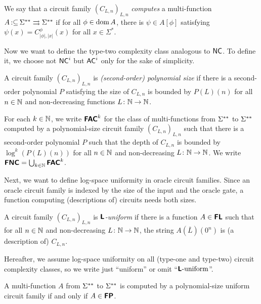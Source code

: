 \documentclass[envcountsect,envcountsame,orivec,oribibl]{llncs}
\newcommand{\pcolon}{\mathpunct{\,:\subseteq}}
\begin{document}
\begin{definition}
 We say that a circuit family $(C_{L,n})_{L,n}$ 
\emph{computes} a multi-function 
 $A \pcolon \LM \rightrightarrows \LM$ if for all $\phi \in \mathop{\rm dom} A$, 
 there is $\psi \in A[\phi]$ satisfying $\psi(x) = C_{|\phi|, |x|}^\phi(x)$
 for all $x \in \Sigma^*$.
\end{definition}

Now we want to define the type-two complexity class analogous to $\mathsf{NC}$.
To define it, we choose not $\mathsf{NC}^i$ but $\mathsf{AC}^i$ 
only for the sake of simplicity.

A circuit family $(C_{L,n})_{L,n}$ is \emph{(second-order) polynomial size}
if there is a second-order polynomial $P$ satisfying
the size of $C_{L,n}$ is bounded by $P(L)(n)$ 
for all $n \in \mathbb N$ and non-decreasing functions
$L \colon \mathbb N \to \mathbb N$.

\begin{definition}
 For each $k \in \mathbb N$, 
 we write $\text{\bfseries \sffamily \upshape FAC}^k$ for the class of 
 multi-functions from $\Sigma ^{**}$ to $\Sigma ^{**}$ computed by
 a polynomial-size circuit family $(C_{L,n})_{L,n}$ such that
 there is a second-order polynomial $P$ such that 
 the depth of $C_{L,n}$ is bounded by $\log^k(P(L)(n))$ 
 for all $n \in \mathbb N$ and non-decreasing
 $L \colon \mathbb N \to \mathbb N$.
 We write $\text{\bfseries \sffamily \upshape FNC} = \bigcup_{k \in \mathbb N} \text{\bfseries \sffamily \upshape FAC}^k$.
\end{definition}

Next, we want to define log-space uniformity in oracle circuit families.
Since an oracle circuit family is indexed by the size of the input and the oracle gate,
a function computing (descriptions of) circuits needs both sizes.

\begin{definition}[uniformity]
A circuit family $(C_{L,n})_{L,n}$ is \emph{$\text{\bfseries \sffamily \upshape L}$-uniform} if there is a function $A \in \text{\bfseries \sffamily \upshape FL}$ 
such that for all $n \in \mathbb N$ and non-decreasing $L \colon \mathbb N \to \mathbb N$, 
the string $A (\overline L) (0^n)$ is (a description of) $C_{L,n}$. 
\end{definition}

Hereafter, we assume log-space uniformity on all (type-one and type-two) 
circuit complexity classes, so we write just ``uniform'' or omit ``$\text{\bfseries \sffamily \upshape L}\text{-uniform}$''.

\begin{theorem}
\label{theorem:P-equals-L-uniform-P-poly}
A multi-function $A$ from $\Sigma ^{**}$ to $\Sigma ^{**}$ is computed by a polynomial-size
uniform circuit family if and only if $A \in \text{\bfseries \sffamily \upshape FP}$.
\end{theorem}
\end{document}
